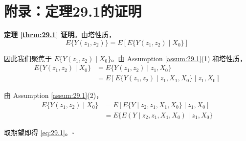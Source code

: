\section{附录：定理29.1的证明}\label{sec:derivation-thm-29.1}\label{sec:cace-application}\label{sec:proof-bk-formulas}\label{sec:proof-mediation}

\textbf{定理 \ref{thrm:29.1} 证明}。由塔性质，
\[
E\{Y(z_1, z_2)\} = E[ E\{Y(z_1, z_2) \mid X_0\} ]
\]

因此我们聚焦于 $E\{Y(z_1, z_2) \mid X_0\}$。由 Assumption \ref{assum:29.1}(1) 和塔性质，
\[
\begin{aligned}
E\{Y(z_1, z_2) \mid X_0\} & = E\{Y(z_1, z_2) \mid z_1, X_0\} \\
& = E[ E\{Y(z_1, z_2) \mid z_1, X_1, X_0\} \mid z_1, X_0 ]
\end{aligned}
\]

由 Assumption \ref{assum:29.1}(2)，
\[
\begin{aligned}
E\{Y(z_1, z_2) \mid X_0\} & = E[ E\{Y \mid z_2, z_1, X_1, X_0\} \mid z_1, X_0 ] \\
& = E\{ E(Y \mid z_2, z_1, X_1, X_0) \mid z_1, X_0 \}
\end{aligned}
\]

取期望即得 \ref{eq:29.1}。$\square$

